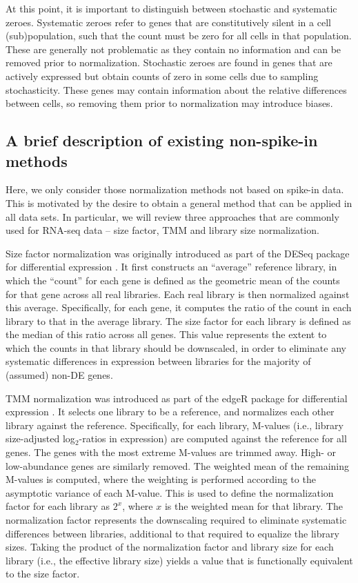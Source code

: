 \documentclass{article}
\begin{document}
At this point, it is important to distinguish between stochastic and systematic zeroes.
Systematic zeroes refer to genes that are constitutively silent in a cell (sub)population, such that the count must be zero for all cells in that population.
These are generally not problematic as they contain no information and can be removed prior to normalization.
Stochastic zeroes are found in genes that are actively expressed but obtain counts of zero in some cells due to sampling stochasticity.
These genes may contain information about the relative differences between cells, so removing them prior to normalization may introduce biases.

\subsection{A brief description of existing non-spike-in methods}
Here, we only consider those normalization methods not based on spike-in data.
This is motivated by the desire to obtain a general method that can be applied in all data sets.
In particular, we will review three approaches that are commonly used for RNA-seq data -- size factor, TMM and library size normalization.

Size factor normalization was originally introduced as part of the DESeq package for differential expression \cite{anders2010differential}.
It first constructs an ``average'' reference library, in which the ``count'' for each gene is defined as the geometric mean of the counts for that gene across all real libraries.
Each real library is then normalized against this average.
Specifically, for each gene, it computes the ratio of the count in each library to that in the average library.
The size factor for each library is defined as the median of this ratio across all genes.
This value represents the extent to which the counts in that library should be downscaled, 
    in order to eliminate any systematic differences in expression between libraries for the majority of (assumed) non-DE genes.

TMM normalization was introduced as part of the edgeR package for differential expression \cite{robinson2010edgeR}.
It selects one library to be a reference, and normalizes each other library against the reference.
Specifically, for each library, M-values (i.e., library size-adjusted log$_2$-ratios in expression) are computed against the reference for all genes.
The genes with the most extreme M-values are trimmed away.
High- or low-abundance genes are similarly removed.
The weighted mean of the remaining M-values is computed, where the weighting is performed according to the asymptotic variance of each M-value.
This is used to define the normalization factor for each library as $2^x$, where $x$ is the weighted mean for that library.
The normalization factor represents the downscaling required to eliminate systematic differences between libraries, additional to that required to equalize the library sizes.
Taking the product of the normalization factor and library size for each library (i.e., the effective library size) yields a value that is functionally equivalent to the size factor.
\end{document}
